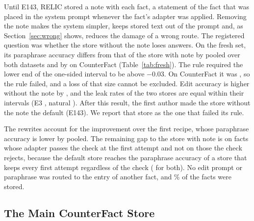 \documentclass[journal,10pt]{IEEEtran}
\begin{document}
Until E143, RELIC stored a note with each fact, a statement of the fact that was placed in the system prompt
whenever the fact's adapter was applied. Removing the note makes the system simpler, keeps stored text out of
the prompt and, as Section~\ref{sec:wrong} shows, reduces the damage of a wrong route. The registered question
was whether the store without the note loses answers. On the fresh set, its paraphrase accuracy differs from
that of the store with note by  pooled
over both datasets and by 
 on CounterFact
(Table~\ref{tab:fresh}). The rule required the lower end of the one-sided interval to be above $-0.03$. On
CounterFact it was ,
so the rule failed, and a loss of that size cannot be excluded. Edit accuracy is higher without the note by
, and the leak rates of the two stores are
equal within their intervals (E3 ,
natural ). After this result, the
first author made the store without the note the default (E143). We report that store as the one that failed
its rule.

The rewrites account for the improvement over the first recipe, whose paraphrase accuracy is lower by
 pooled. The remaining gap to the store with
note is on facts whose adapter passes the check at the first attempt and not on those the check rejects,
because the default store reaches the paraphrase accuracy of a store that keeps every first attempt
regardless of the check ( for both). No edit prompt or paraphrase
was routed to the entry of another fact, and \% of the facts were
stored.

\subsection{The Main CounterFact Store}
\label{sec:seen}
\end{document}

